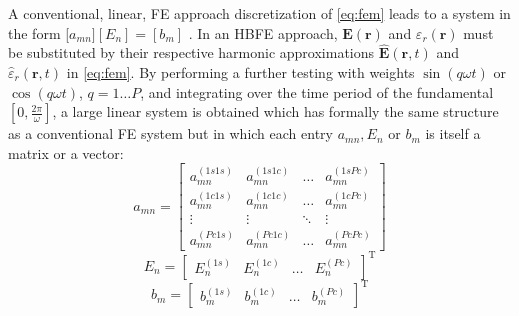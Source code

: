 \documentclass[journal,twoside]{IEEEtran}
\renewcommand{\vec}[1]{\mathbf{#1}}
\begin{document}
%
A conventional, linear, FE approach discretization of \eqref{eq:fem} 
leads to a system in the form [$a_{mn}][E_n] = [b_m]$ \cite{Pelosi2009}.
In an HBFE approach, $\vec{E}(\vec{r})$ and
${\varepsilon}_r(\vec{r})$ must be substituted by their respective harmonic 
approximations $\vec{\hat{E}}(\vec{r}, t)$ and $\hat{{\varepsilon}}_r(\vec{r}, t)$ in \eqref{eq:fem}.  By performing
a further testing with weights $\sin(q \omega t)$ or
$\cos(q \omega t)$, $q = 1 \dots P$, and integrating over the time period of the fundamental $\left [
0,\frac{2\pi}{\omega} \right ]$,  a large linear system is
obtained which has formally the same structure as 
a conventional FE system but in which each entry $a_{mn}, E_n$ or $b_m$
is itself a matrix or a vector:
%
\begin{equation}\label{e:HBfemmn}
a_{mn}=
\begin{bmatrix}
a_{mn}^{(1s1s)} & a_{mn}^{(1s1c)} & \ldots &  a_{mn}^{(1sPc)} \\
a_{mn}^{(1c1s)} & a_{mn}^{(1c1c)} & \ldots &  a_{mn}^{(1cPc)} \\
\vdots & \vdots & \ddots & \vdots \\
a_{mn}^{(Pc1s)} & a_{mn}^{(Pc1c)} & \ldots &  a_{mn}^{(PcPc)}
\end{bmatrix}
\end{equation}
\begin{equation} 
E_n = 
\begin{bmatrix}
E_{n}^{(1s)} &
E_{n}^{(1c)} &
\ldots &
E_{n}^{(Pc)}
\end{bmatrix}^\text{T}
\end{equation}
\begin{equation}
b_m = 
\begin{bmatrix}
b_{m}^{(1s)} &
b_{m}^{(1c)} &
\ldots &
b_{m}^{(Pc)}
\end{bmatrix}^\text{T}
\end{equation}
\end{document}

